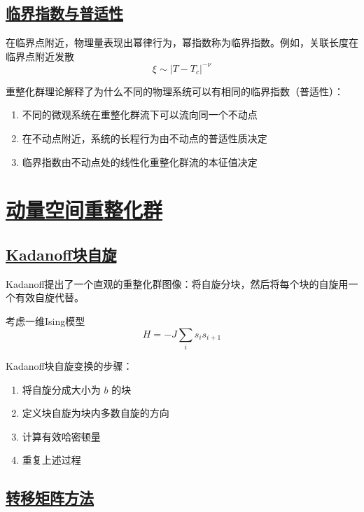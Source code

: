 \subsection{\protect\hyperlink{:}{临界指数与普适性}}

在临界点附近，物理量表现出幂律行为，幂指数称为临界指数。例如，关联长度在临界点附近发散
\begin{equation}
    \xi \sim |T - T_c|^{-\nu}
\end{equation}

重整化群理论解释了为什么不同的物理系统可以有相同的临界指数（普适性）：
\begin{enumerate}
    \item 不同的微观系统在重整化群流下可以流向同一个不动点
    \item 在不动点附近，系统的长程行为由不动点的普适性质决定
    \item 临界指数由不动点处的线性化重整化群流的本征值决定
\end{enumerate}

\section{\protect\hyperlink{:}{动量空间重整化群}}

\subsection{\protect\hyperlink{:}{Kadanoff块自旋}}

Kadanoff提出了一个直观的重整化群图像：将自旋分块，然后将每个块的自旋用一个有效自旋代替。

考虑一维Ising模型
\begin{equation}
    H = -J\sum_i s_i s_{i+1}
\end{equation}

Kadanoff块自旋变换的步骤：
\begin{enumerate}
    \item 将自旋分成大小为 $b$ 的块
    \item 定义块自旋为块内多数自旋的方向
    \item 计算有效哈密顿量
    \item 重复上述过程
\end{enumerate}

\subsection{\protect\hyperlink{:}{转移矩阵方法}}

